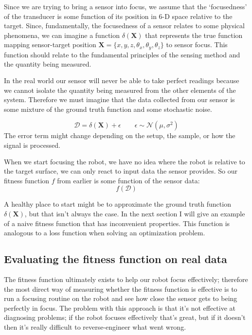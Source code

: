 \documentclass[11pt]{article}
\begin{document}
Since we are trying to bring a sensor into focus, we assume that the `focusedness' of the transducer is some function of its position in 6-D space relative to the target. Since, fundamentally, the focusedness of a sensor relates to some physical phenomena, we can imagine a function $\delta(\mathbf{X})$ that represents the true function mapping sensor-target position $\mathbf{X} = \{x,y,z,\theta_x,\theta_y, \theta_z\}$ to sensor focus.
This function should relate to the fundamental principles of the sensing method and the quantity being measured.

In the real world our sensor will never be able to take perfect readings because we cannot isolate the quantity being measured from the other elements of the system. Therefore we must imagine that the data collected from our sensor is some mixture of the ground truth function and some stochastic noise.

\begin{equation*}
    \mathcal{D} = \delta(\mathbf{X}) + \epsilon \qquad \epsilon \sim \mathcal{N}(\mu, \sigma^2)
\end{equation*}
The error term might change depending on the setup, the sample, or how the signal is processed.

When we start focusing the robot, we have no idea where the robot is relative to the target surface, we can only react to input data the sensor provides. So our fitness function $f$ from earlier is some function of the sensor data:
\begin{equation*}
    f(\mathcal{D})
\end{equation*}

A healthy place to start might be to approximate the ground truth function $\delta(\mathbf{X})$, but that isn't always the case. In the next section I will give an example of a naive fitness function that has inconvenient properties. This function is analogous to a loss function when solving an optimization problem.

\subsection{Evaluating the fitness function on real data}
The fitness function ultimately exists to help our robot focus effectively; therefore the most direct way of measuring whether the fitness function is effective is to run a focusing routine on the robot and see how close the sensor gets to being perfectly in focus. The problem with this approach is that it's not effective at diagnosing problems; if the robot focuses effectively that's great, but if it doesn't then it's really difficult to reverse-engineer what went wrong.
\end{document}
